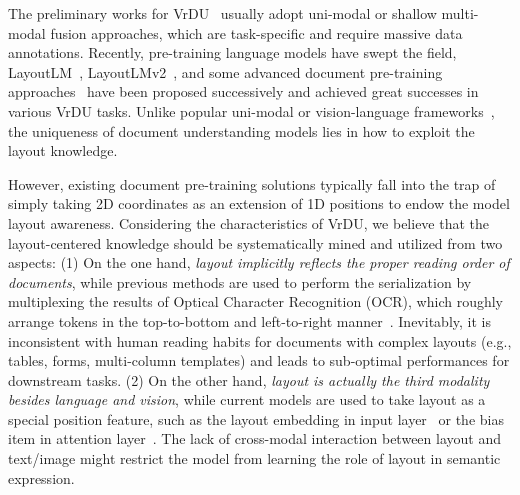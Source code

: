 \documentclass[11pt]{article}
\begin{document}
The preliminary works for VrDU~\cite{yang2016hierarchical,yang2017learning,katti2018chargrid,sarkhel2019deterministic,cheng2020one} usually adopt uni-modal or shallow multi-modal fusion approaches, which are task-specific and require massive data annotations.
Recently, pre-training language models have swept the field, LayoutLM~\cite{xu2020layoutlm}, LayoutLMv2~\cite{xu2021layoutlmv2}, and some advanced document pre-training approaches~\cite{li2021structurallm,appalaraju2021docformer,gu2022xylayoutlm} have been proposed successively and achieved great successes in various VrDU tasks.
Unlike popular uni-modal or vision-language frameworks~\cite{devlin2019bert,liu2019roberta,lu2019vilbert,yu2021ernie}, the uniqueness of document understanding models lies in how to exploit the layout knowledge. 

However, existing document pre-training solutions typically fall into the trap of simply taking 2D coordinates as an extension of 1D positions to endow the model layout awareness. 
Considering the characteristics of VrDU, we believe that the layout-centered knowledge should be systematically mined and utilized from two aspects:
(1) On the one hand, \emph{layout implicitly reflects the proper reading order of documents}, while previous methods are used to perform the serialization by multiplexing the results of Optical Character Recognition (OCR), which roughly arrange tokens in the top-to-bottom and left-to-right manner~\cite{wang2021layoutreader,gu2022xylayoutlm}. 
Inevitably, it is inconsistent with human reading habits for documents with complex layouts (e.g., tables, forms, multi-column templates) and leads to sub-optimal performances for downstream tasks.
(2) On the other hand, \emph{layout is actually the third modality besides language and vision}, while current models are used to take layout as a special position feature, such as the layout embedding in input layer~\cite{xu2020layoutlm} or the bias item in attention layer~\cite{xu2021layoutlmv2}.
The lack of cross-modal interaction between layout and text/image might restrict the model from learning the role of layout in semantic expression.
\end{document}
